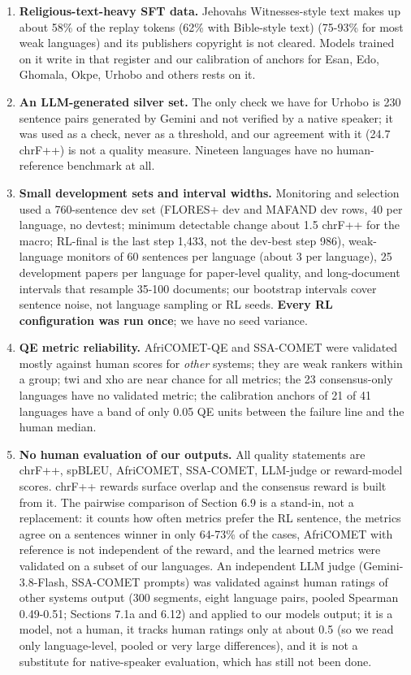 \begin{enumerate}
\item
  \textbf{Religious-text-heavy SFT data.} Jehovah\textquotesingle s Witnesses-style text makes up about 58\% of the replay tokens (62\% with Bible-style text) (75-93\% for most weak languages) and its publisher\textquotesingle s copyright is not cleared. Models trained on it write in that register and our calibration of anchors for Esan, Edo, Ghomala, Okpe, Urhobo and others rests on it.
\item
  \textbf{An LLM-generated silver set.} The only check we have for Urhobo is 230 sentence pairs generated by Gemini and not verified by a native speaker; it was used as a check, never as a threshold, and our agreement with it (24.7 chrF++) is not a quality measure. Nineteen languages have no human-reference benchmark at all.
\item
  \textbf{Small development sets and interval widths.} Monitoring and selection used a 760-sentence dev set (FLORES+ dev and MAFAND dev rows, 40 per language, no devtest; minimum detectable change about 1.5 chrF++ for the macro; RL-final is the last step 1,433, not the dev-best step 986), weak-language monitors of 60 sentences per language (about 3 per language), 25 development papers per language for paper-level quality, and long-document intervals that resample 35-100 documents; our bootstrap intervals cover sentence noise, not language sampling or RL seeds. \textbf{Every RL configuration was run once}; we have no seed variance.
\item
  \textbf{QE metric reliability.} AfriCOMET-QE and SSA-COMET were validated mostly against human scores for \emph{other} systems; they are weak rankers within a group; twi and xho are near chance for all metrics; the 23 consensus-only languages have no validated metric; the calibration anchors of 21 of 41 languages have a band of only 0.05 QE units between the failure line and the human median.
\item
  \textbf{No human evaluation of our outputs.} All quality statements are chrF++, spBLEU, AfriCOMET, SSA-COMET, LLM-judge or reward-model scores. chrF++ rewards surface overlap and the consensus reward is built from it. The pairwise comparison of Section 6.9 is a stand-in, not a replacement: it counts how often metrics prefer the RL sentence, the metrics agree on a sentence\textquotesingle s winner in only 64-73\% of the cases, AfriCOMET with reference is not independent of the reward, and the learned metrics were validated on a subset of our languages. An independent LLM judge (Gemini-3.8-Flash, SSA-COMET prompts) was validated against human ratings of other systems\textquotesingle{} output (300 segments, eight language pairs, pooled Spearman 0.49-0.51; Sections 7.1a and 6.12) and applied to our models\textquotesingle{} output; it is a model, not a human, it tracks human ratings only at about 0.5 (so we read only language-level, pooled or very large differences), and it is not a substitute for native-speaker evaluation, which has still not been done.

\end{enumerate}
